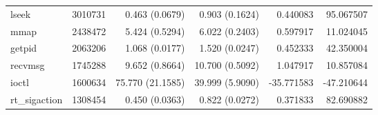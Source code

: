 \begin{tabular}{>{\ttfamily}lrrrrr}
                          lseek &   3010731 &           0.463 (0.0679) &           0.903 (0.1624) &        0.440083 &    95.067507 \\
                           mmap &   2438472 &           5.424 (0.5294) &           6.022 (0.2403) &        0.597917 &    11.024045 \\
                         getpid &   2063206 &           1.068 (0.0177) &           1.520 (0.0247) &        0.452333 &    42.350004 \\
                        recvmsg &   1745288 &           9.652 (0.8664) &          10.700 (0.5092) &        1.047917 &    10.857084 \\
                          ioctl &   1600634 &         75.770 (21.1585) &          39.999 (5.9090) &      -35.771583 &   -47.210644 \\
                  rt\_sigaction &   1308454 &           0.450 (0.0363) &           0.822 (0.0272) &        0.371833 &    82.690882 \\
\bottomrule
\end{tabular}
